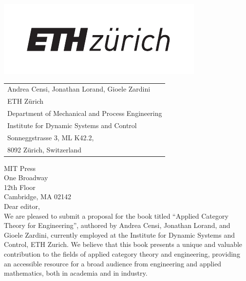 \documentclass[10pt, article, one side]{memoir}
\begin{document}
    \begin{minipage}{0.45\linewidth}
        \includegraphics[width=0.9\linewidth]{pics/ethlogo.pdf}
        \vfill
    \end{minipage}
    \begin{minipage}{0.5\linewidth}
        \begin{flushright}
            \begin{tabular}{l}
                Andrea Censi, Jonathan Lorand, Gioele Zardini \\
                ETH Z\"urich \\
                Department of Mechanical and Process Engineering \\
                Institute for Dynamic Systems and Control \\
                Sonneggstrasse 3, ML K42.2, \\
                8092 Z\"urich, Switzerland
            \end{tabular}
        \end{flushright}
    \end{minipage}

    \vspace{1cm}

    \noindent MIT Press\\
    \noindent One Broadway\\
    \noindent 12th Floor \\
    \noindent Cambridge, MA 02142\\[+7pt]

    Dear editor,\\[-5pt]

    We are pleased to submit a proposal for the book titled ``Applied Category Theory for Engineering'', authored by 
    Andrea Censi, 
    Jonathan Lorand, and Gioele Zardini, currently employed at the Institute for Dynamic Systems and Control, ETH Zurich.
    We believe that this book presents a unique and valuable contribution to the fields of applied category theory and engineering, providing an accessible resource for a broad audience from engineering and applied mathematics, both in academia and in industry.
    \\[-7pt]
    
\end{document}
